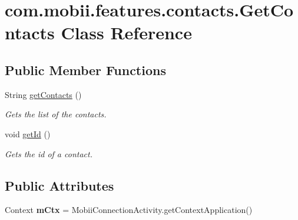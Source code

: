 \hypertarget{classcom_1_1mobii_1_1features_1_1contacts_1_1_get_contacts}{\section{com.\-mobii.\-features.\-contacts.\-Get\-Contacts Class Reference}
\label{classcom_1_1mobii_1_1features_1_1contacts_1_1_get_contacts}
}
\subsection*{Public Member Functions}
\begin{DoxyCompactItemize}
\item 
String \hyperlink{classcom_1_1mobii_1_1features_1_1contacts_1_1_get_contacts_ad3dd8ec4fcbd66d99242ad7fa2e738cf}{get\-Contacts} ()
\begin{DoxyCompactList}\small\item\em Gets the list of the contacts. \end{DoxyCompactList}\item 
\hypertarget{classcom_1_1mobii_1_1features_1_1contacts_1_1_get_contacts_a97cc2ac8ba9d692fd495bbf58e0904ad}{void \hyperlink{classcom_1_1mobii_1_1features_1_1contacts_1_1_get_contacts_a97cc2ac8ba9d692fd495bbf58e0904ad}{get\-Id} ()}\label{classcom_1_1mobii_1_1features_1_1contacts_1_1_get_contacts_a97cc2ac8ba9d692fd495bbf58e0904ad}

\begin{DoxyCompactList}\small\item\em Gets the id of a contact. \end{DoxyCompactList}\end{DoxyCompactItemize}
\subsection*{Public Attributes}
\begin{DoxyCompactItemize}
\item 
\hypertarget{classcom_1_1mobii_1_1features_1_1contacts_1_1_get_contacts_a0fd61b05749d48053fe96a396c9d7d1f}{Context {\bfseries m\-Ctx} = Mobii\-Connection\-Activity.\-get\-Context\-Application()}\label{classcom_1_1mobii_1_1features_1_1contacts_1_1_get_contacts_a0fd61b05749d48053fe96a396c9d7d1f}

\end{DoxyCompactItemize}


